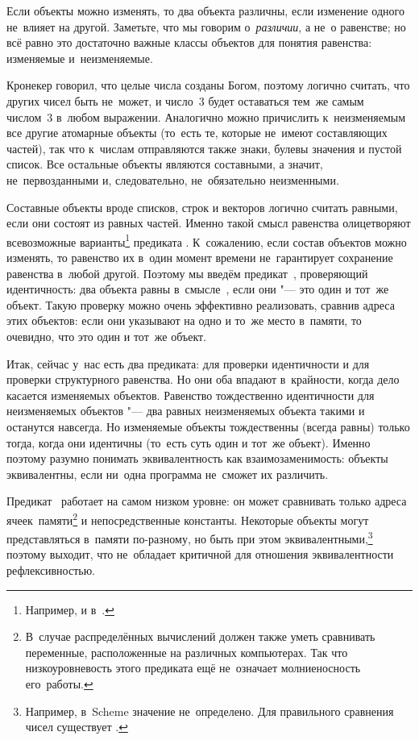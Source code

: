 Если объекты можно изменять, то два объекта различны, если изменение одного
не~влияет на другой. Заметьте, что мы говорим о~\emph{различии}, а не~о
равенстве; но всё равно это достаточно важные классы объектов для понятия
равенства: изменяемые и~неизменяемые.

Кронекер говорил, что целые числа созданы Богом, поэтому логично считать, что
других чисел быть не~может, и число~3 будет оставаться тем~же самым числом~3
в~любом выражении. Аналогично можно причислить к~неизменяемым все другие
атомарные объекты (то~есть те, которые не~имеют составляющих частей), так что
к~числам отправляются также знаки, булевы значения и пустой список. Все
остальные объекты являются составными, а значит, не~первозданными и,
следовательно, не~обязательно неизменными.

Составные объекты вроде списков, строк и векторов логично считать равными, если
они состоят из равных частей. Именно такой смысл равенства олицетворяют
всевозможные варианты\footnote{Например,  и 
в~{\CommonLisp}.} предиката . К~сожалению, если состав объектов можно
изменять, то равенство их в~один момент времени не~гарантирует сохранение
равенства в~любой другой. Поэтому мы введём предикат~, проверяющий
идентичность: два объекта равны в~смысле~, если они "--- это один и
тот~же объект. Такую проверку можно очень эффективно реализовать, сравнив адреса
этих объектов: если они указывают на одно и то~же место в~памяти, то очевидно,
что это один и тот~же объект.

\bigskip

Итак, сейчас у~нас есть два предиката:  для проверки идентичности и
 для проверки структурного равенства. Но они оба впадают в~крайности,
когда дело касается изменяемых объектов. Равенство тождественно идентичности для
неизменяемых объектов "--- два равных неизменяемых объекта такими и останутся
навсегда. Но изменяемые объекты тождественны (всегда равны) только тогда, когда
они идентичны (то~есть суть один и тот~же объект). Именно поэтому разумно
понимать эквивалентность как взаимозаменимость: объекты эквивалентны, если
ни~одна программа не~сможет их различить.

Предикат~ работает на самом низком уровне: он может сравнивать только
адреса ячеек~памяти\footnote{В~случае распределённых вычислений  должен
также уметь сравнивать переменные, расположенные на различных компьютерах. Так
что низкоуровневость этого предиката ещё не~означает молниеносность его~работы.}
и непосредственные константы. Некоторые объекты могут представляться в~памяти
по-разному, но быть при этом эквивалентными,\footnote*{Например, в~Scheme
значение  не~определено. Для правильного сравнения чисел
существует .} поэтому выходит, что  не~обладает критичной для
отношения эквивалентности рефлексивностью.

